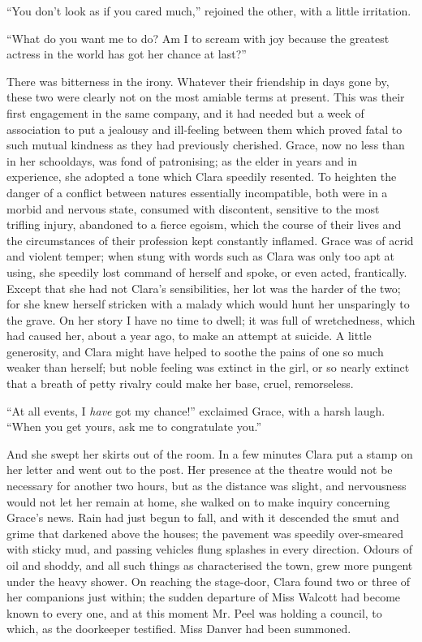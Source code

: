 ``You don't look as if you cared much,'' rejoined the other, with a
little irritation.

``What do you want me to do? Am I to scream with joy because the
greatest actress in the world has got her chance at last?''

There was bitterness in the irony. Whatever their friendship in days
gone by, these two were clearly not on the most amiable terms at
present. This was their first engagement in the same company, and it had
needed but a week of association to put a jealousy and ill-feeling
between them which proved fatal to such mutual kindness as they had
previously cherished. Grace, now no less than in her schooldays, was
fond of patronising; as the elder in years and in experience, she
adopted a tone which Clara speedily resented. To heighten the danger of
a conflict between natures essentially incompatible, both were in a
morbid and nervous state, consumed with discontent, sensitive to the
most trifling injury, abandoned to a fierce egoism, which {}the course
of their lives and the circumstances of their profession kept constantly
inflamed. Grace was of acrid and violent temper; when stung with words
such as Clara was only too apt at using, she speedily lost command of
herself and spoke, or even acted, frantically. Except that she had not
Clara's sensibilities, her lot was the harder of the two; for she knew
herself stricken with a malady which would hunt her unsparingly to the
grave. On her story I have no time to dwell; it was full of
wretchedness, which had caused her, about a year ago, to make an attempt
at suicide. A little generosity, and Clara might have helped to soothe
the pains of one so much weaker than herself; but noble feeling was
extinct in the girl, or so nearly extinct that a breath of petty rivalry
could make her base, cruel, remorseless.

``At all events, I \emph{have} got my chance!'' exclaimed Grace, with a
harsh laugh. ``When you get yours, ask me to congratulate you.''

And she swept her skirts out of the room. In a few minutes Clara put a
stamp on her {}letter and went out to the post. Her presence at the
theatre would not be necessary for another two hours, but as the
distance was slight, and nervousness would not let her remain at home,
she walked on to make inquiry concerning Grace's news. Rain had just
begun to fall, and with it descended the smut and grime that darkened
above the houses; the pavement was speedily over-smeared with sticky
mud, and passing vehicles flung splashes in every direction. Odours of
oil and shoddy, and all such things as characterised the town, grew more
pungent under the heavy shower. On reaching the stage-door, Clara found
two or three of her companions just within; the sudden departure of Miss
Walcott had become known to every one, and at this moment Mr. Peel was
holding a council, to which, as the doorkeeper testified. Miss Danver
had been summoned.


